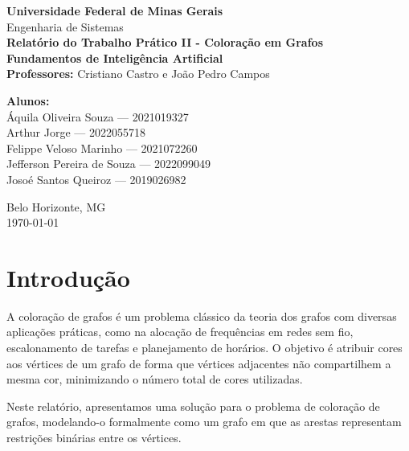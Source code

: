 \documentclass[12pt,a4paper]{article}
\begin{document}

\begin{titlepage}
    \centering
    {\Large \textbf{Universidade Federal de Minas Gerais}}\\[0.3cm]
    {\large Engenharia de Sistemas}\\[2cm]
    
    {\Huge \textbf{Relatório do Trabalho Prático II - Coloração em Grafos}}\\[1.5cm]
    
    \textbf{Fundamentos de Inteligência Artificial}\\[0.5cm]
    \textbf{Professores:} Cristiano Castro e João Pedro Campos\\[1.5cm]
    
    \begin{flushleft}
        \textbf{Alunos:}\\
        Áquila Oliveira Souza --- 2021019327\\
        Arthur Jorge --- 2022055718\\
        Felippe Veloso Marinho --- 2021072260\\
        Jefferson Pereira de Souza --- 2022099049\\
        Josoé Santos Queiroz --- 2019026982
    \end{flushleft}
    
    \vfill
    {\large Belo Horizonte, MG}\\
    {\large \today}
\end{titlepage}

\clearpage
{}
\tableofcontents
\clearpage

\section{Introdução}
A coloração de grafos é um problema clássico da teoria dos grafos com diversas aplicações práticas, como na alocação de frequências em redes sem fio, escalonamento de tarefas e planejamento de horários. O objetivo é atribuir cores aos vértices de um grafo de forma que vértices adjacentes não compartilhem a mesma cor, minimizando o número total de cores utilizadas.

Neste relatório, apresentamos uma solução para o problema de coloração de grafos, modelando-o formalmente como um grafo em que as arestas representam restrições binárias entre os vértices.
\end{document}
